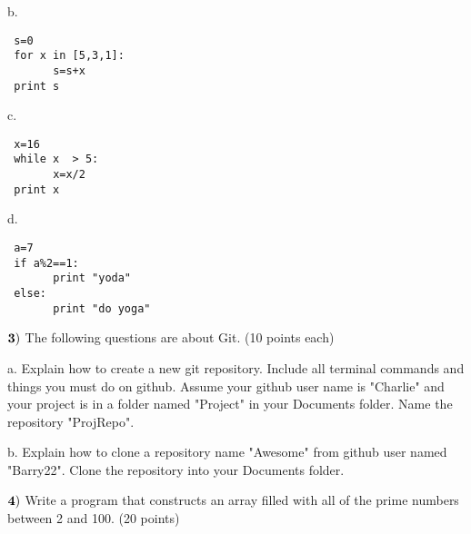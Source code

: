 \documentclass{article}
\begin{document}
 b.  \begin{verbatim}
 s=0
 for x in [5,3,1]:
       s=s+x
 print s
 \end{verbatim}
 \vspace{1cm}
 
 c.  \begin{verbatim}
 x=16
 while x  > 5:
       x=x/2
 print x
 \end{verbatim}
 \vspace{1cm}
 
 d.   \begin{verbatim}
 a=7
 if a%2==1:
       print "yoda"
 else:
       print "do yoga"
 \end{verbatim}
 \vspace{1cm}
  \newpage

  
  $\bf{3)}$  The following questions are about Git. (10 points each)
  \vspace{0.5cm}
    
  a.  Explain how to create a new git repository.  Include all terminal commands and things you must do on github.  Assume your github user name is "Charlie" and your project is in a folder named "Project" in your Documents folder.  Name the repository "ProjRepo".
    \vspace{8cm}
  
  b.  Explain how to clone a repository name "Awesome" from github user named "Barry22".  Clone the repository into your Documents folder.
    \vspace{4cm}
  
   
  \newpage
  
  $\bf{4)}$ Write a program that constructs an array filled with all of the prime numbers between 2 and 100. (20 points)
  \vspace{0.5cm}
  
  
  
  

 
\end{document}
